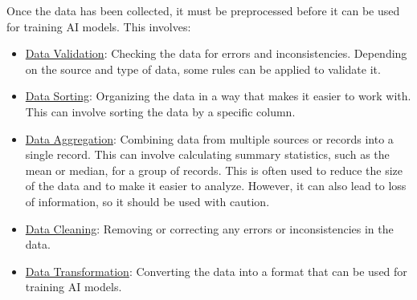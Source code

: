 Once the data has been collected, it must be preprocessed before it can be used for training AI models. This involves:
\begin{itemize}
    \item \ul{Data Validation}: Checking the data for errors and inconsistencies. Depending on the source and type of data, some rules can be applied to validate it.
    \item \ul{Data Sorting}: Organizing the data in a way that makes it easier to work with. This can involve sorting the data by a specific column.
    \item \ul{Data Aggregation}: Combining data from multiple sources or records into a single record. This can involve calculating summary statistics, such as the mean or median, for a group of records. This is often used to reduce the size of the data and to make it easier to analyze. However, it can also lead to loss of information, so it should be used with caution.
    \item \ul{Data Cleaning}: Removing or correcting any errors or inconsistencies in the data.
    \item \ul{Data Transformation}: Converting the data into a format that can be used for training AI models.
\end{itemize}

